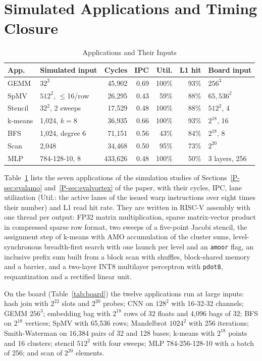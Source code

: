 \section{Simulated Applications and Timing Closure}\label{sup:sim}
\begin{table}[t]
\caption{Applications and Their Inputs}
\label{tab:apps}
\centering\footnotesize
\setlength{\tabcolsep}{2.6pt}
\begin{tabular}{llrrrrl}
\toprule
App. & Simulated input & Cycles & IPC & Util. & L1 hit & Board input\\
\midrule
GEMM    & $32^3$               & 45,902  & 0.69 & 100\% & 93\% & $256^3$\\
SpMV    & $512^2$, $\le$16/row & 26,295  & 0.43 & 59\%  & 88\% & $65{,}536^2$\\
Stencil & $32^2$, 2 sweeps     & 17,529  & 0.48 & 100\% & 88\% & $512^2$, 4\\
k-means & 1,024, $k=8$         & 36,935  & 0.66 & 100\% & 93\% & $2^{18}$, 16\\
BFS     & 1,024, degree 6      & 71,151  & 0.56 & 43\%  & 84\% & $2^{18}$, 8\\
Scan    & 2,048                & 34,468  & 0.50 & 95\%  & 73\% & $2^{20}$\\
MLP     & 784-128-10, 8        & 433,626 & 0.48 & 100\% & 50\% & 3 layers, 256\\
\bottomrule
\end{tabular}

\end{table}

Table~\ref{tab:apps} lists the seven applications of the simulation studies of
Sections~\ref{P-sec:evalamo} and~\ref{P-sec:evalvortex} of the paper, with their
cycles, IPC, lane utilization (Util.: the active lanes of the issued warp instructions
over eight times their number) and L1 read hit rate. They are written
in RISC-V assembly with one thread per output: FP32 matrix multiplication, sparse
matrix-vector product in compressed sparse row format, two sweeps of a five-point
Jacobi stencil, the assignment step of k-means with AMO accumulation of the cluster
sums, level-synchronous breadth-first search with one launch per level and an
\texttt{amoor} flag, an inclusive prefix sum built from a block scan with shuffles,
block-shared memory and a barrier, and a two-layer INT8 multilayer perceptron with
\texttt{pdot8}, requantization and a rectified linear unit.

On the board (Table~\ref{tab:board}) the twelve applications run at
large inputs: hash join with $2^{22}$ slots and $2^{20}$ probes; CNN on $128^2$ with
16-32-32 channels; GEMM $256^3$; embedding bag with $2^{18}$ rows of 32 floats and 4,096
bags of 32; BFS on $2^{18}$ vertices; SpMV with 65,536 rows; Mandelbrot $1024^2$ with 256
iterations; Smith-Waterman on 16,384 pairs of 32 and 128 bases; k-means with $2^{18}$
points and 16 clusters; stencil $512^2$ with four sweeps; MLP 784-256-128-10 with a batch
of 256; and scan of $2^{20}$ elements.

